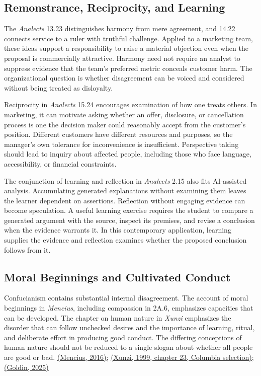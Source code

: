 \hypertarget{M09-remonstrance-reciprocity-and-learning}{%
\subsection{Remonstrance, Reciprocity, and
Learning}\label{M09-remonstrance-reciprocity-and-learning}}

\noindent \noindent The \emph{Analects} 13.23 distinguishes harmony from mere
agreement, and 14.22 connects service to a ruler with truthful
challenge. Applied to a marketing team, these ideas support a
responsibility to raise a material objection even when the proposal is
commercially attractive. Harmony need not require an analyst to suppress
evidence that the team's preferred metric conceals customer harm. The
organizational question is whether disagreement can be voiced and
considered without being treated as disloyalty.

Reciprocity in \emph{Analects} 15.24 encourages examination of how one
treats others. In marketing, it can motivate asking whether an offer,
disclosure, or cancellation process is one the decision maker could
reasonably accept from the customer's position. Different customers have
different resources and purposes, so the manager's own tolerance for
inconvenience is insufficient. Perspective taking should lead to inquiry
about affected people, including those who face language, accessibility,
or financial constraints.

The conjunction of learning and reflection in \emph{Analects} 2.15 also
fits AI-assisted analysis. Accumulating generated explanations without
examining them leaves the learner dependent on assertions. Reflection
without engaging evidence can become speculation. A useful learning
exercise requires the student to compare a generated argument with the
source, inspect its premises, and revise a conclusion when the evidence
warrants it. In this contemporary application, learning supplies the
evidence and reflection examines whether the proposed conclusion follows
from it.

\hypertarget{M09-moral-beginnings-and-cultivated-conduct}{%
\subsection{Moral Beginnings and Cultivated
Conduct}\label{M09-moral-beginnings-and-cultivated-conduct}}

\noindent \noindent Confucianism contains substantial internal disagreement. The
account of moral beginnings in \emph{Mencius}, including compassion in
2A.6, emphasizes capacities that can be developed. The chapter on human
nature in \emph{Xunzi} emphasizes the disorder that can follow unchecked
desires and the importance of learning, ritual, and deliberate effort in
producing good conduct. The differing conceptions of human nature should
not be reduced to a single slogan about whether all people are good or
bad.
\href{https://scholarworks.iu.edu/iuswrrest/api/core/bitstreams/265d73a0-6bfa-45df-92ff-4e7d3f8be4b1/content}{(Mencius,
2016)};
\href{https://afe.easia.columbia.edu/main_pop/ps/ps_china-xunzi-human-nature.htm}{(Xunzi,
1999, chapter 23, Columbia selection)};
\href{https://plato.stanford.edu/entries/xunzi/}{(Goldin, 2025)}

